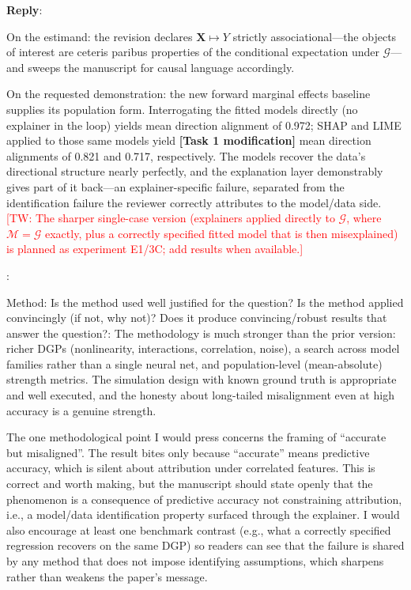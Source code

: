 \documentclass[11pt]{article}
\newcommand{\tw}[1]{\textcolor{red}{[TW: #1]}}
\newcounter{se}[section]
\newcounter{reviewer}
\newcounter{point}[reviewer]
\renewcommand{\thepoint}{R\,\thereviewer.\arabic{point}}
\newenvironment{point}{
    \refstepcounter{point} \bigskip \noindent {\textbf{\thepoint}}: \rmfamily \itshape
}{\medskip}
\newenvironment{reply}
 {\par\medskip \noindent \begin{sf}\textbf{Reply}:\ }
 {\medskip \end{sf}}
\begin{document}
\begin{reply}
{\color{red}
On the estimand: the revision declares $\mathbf{X}\mapsto Y$ strictly associational---the objects of interest are ceteris paribus properties of the conditional expectation under $\mathcal{G}$---and sweeps the manuscript for causal language accordingly.

On the requested demonstration: the new forward marginal effects baseline supplies its population form. Interrogating the fitted models directly (no explainer in the loop) yields mean direction alignment of 0.972; SHAP and LIME applied to those same models yield {\color{blue}\textbf{[Task 1 modification]} mean direction alignments of 0.821 and 0.717, respectively}. The models recover the data's directional structure nearly perfectly, and the explanation layer demonstrably gives part of it back---an explainer-specific failure, separated from the identification failure the reviewer correctly attributes to the model/data side. \tw{The sharper single-case version (explainers applied directly to $\mathcal{G}$, where $\mathcal{M}=\mathcal{G}$ exactly, plus a correctly specified fitted model that is then misexplained) is planned as experiment E1/3C; add results when available.}
}
\end{reply}


\begin{point}
Method: Is the method used well justified for the question? Is the method applied convincingly (if not, why not)? Does it produce convincing/robust results that answer the question?: The methodology is much stronger than the prior version: richer DGPs (nonlinearity, interactions, correlation, noise), a search across model families rather than a single neural net, and population-level (mean-absolute) strength metrics. The simulation design with known ground truth is appropriate and well executed, and the honesty about long-tailed misalignment even at high accuracy is a genuine strength.

The one methodological point I would press concerns the framing of ``accurate but misaligned''. The result bites only because ``accurate'' means predictive accuracy, which is silent about attribution under correlated features. This is correct and worth making, but the manuscript should state openly that the phenomenon is a consequence of predictive accuracy not constraining attribution, i.e., a model/data identification property surfaced through the explainer. I would also encourage at least one benchmark contrast (e.g., what a correctly specified regression recovers on the same DGP) so readers can see that the failure is shared by any method that does not impose identifying assumptions, which sharpens rather than weakens the paper's message.
\end{point}
\end{document}
